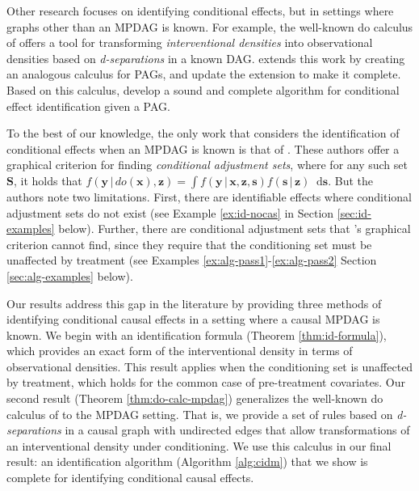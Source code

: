 \documentclass[11pt]{article}
\newcommand{\mb}[1]{\mathbf{#1}}
\newcommand*\diff{\mathop{}\!\mathrm{d}}
\begin{document}
Other research focuses on identifying conditional effects, but in settings where graphs other than an MPDAG is known. For example, the well-known do calculus of \cite{pearl2009causality} offers a tool for transforming \textit{interventional densities} into observational densities based on \textit{d-separations} in a known DAG. \cite{zhang2008causal} extends this work by creating an analogous calculus for PAGs, and \cite{jaber2022causal} update the extension to make it complete. Based on this calculus, \cite{jaber2022causal} develop a sound and complete algorithm for conditional effect identification given a PAG. 

To the best of our knowledge, the only work that considers the identification of conditional effects when an MPDAG is known is that of \cite{laplante2024conditional}. These authors offer a graphical criterion for finding \textit{conditional adjustment sets}, where for any such set $\mb{S}$, it holds that $f(\mb{y} \,|\, do(\mb{x}), \mb{z}) = \int f(\mb{y} \,|\, \mb{x}, \mb{z}, \mb{s}) f(\mb{s} \,|\, \mb{z}) \diff \mb{s}$. But the authors note two limitations. First, there are identifiable effects where conditional adjustment sets do not exist (see Example \ref{ex:id-nocas} in Section \ref{sec:id-examples} below). Further, there are conditional adjustment sets that  \cite{laplante2024conditional}'s graphical criterion cannot find, since they require that the conditioning set must be unaffected by treatment (see Examples \ref{ex:alg-pass1}-\ref{ex:alg-pass2} Section \ref{sec:alg-examples} below).

Our results address this gap in the literature by providing three methods of identifying conditional causal effects in a setting where a causal MPDAG is known. We begin with an identification formula (Theorem \ref{thm:id-formula}), which provides an exact form of the interventional density in terms of observational densities. This result applies when the conditioning set is unaffected by treatment, which holds for the common case of pre-treatment covariates. Our second result (Theorem \ref{thm:do-calc-mpdag}) generalizes the well-known do calculus of \cite{pearl2009causality} to the MPDAG setting. That is, we provide a set of rules based on \textit{d-separations} in a causal graph with undirected edges that allow transformations of an interventional density under conditioning. We use this calculus in our final result: an identification algorithm (Algorithm \ref{alg:cidm}) that we show is complete for identifying conditional causal effects.
\end{document}
